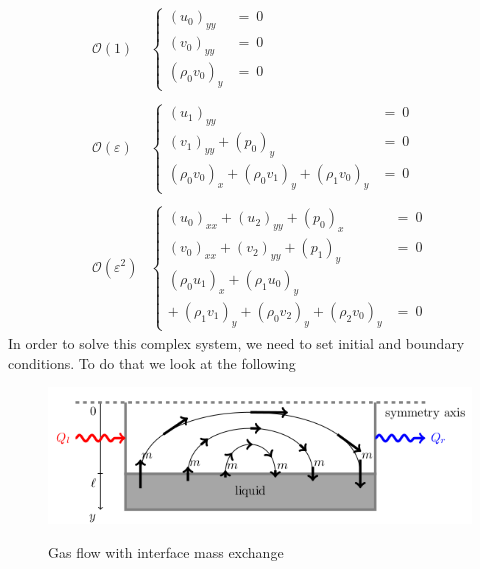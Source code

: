 \documentclass{article}
\begin{document}
\begin{align}
\label{eq:diff00}
\mathcal{O}(1)&\left\{\begin{array}{lr}
(u_{0})_{yy} &=\ 0\\
(v_{0})_{yy} &=\ 0\\
(\rho_{0}v_{0})_{y} &=\ 0
  \end{array}\right.\\\nonumber\\
\label{eq:diff01}
  \mathcal{O}(\varepsilon)&\left\{\begin{array}{lr}
  (u_{1})_{yy} &=\ 0\\
  (v_{1})_{yy}+(p_{0})_{y} &=\ 0\\
  (\rho_{0}v_{0})_{x} + (\rho_{0}v_{1})_{y} + (\rho_{1}v_{0})_{y} &=\ 0
    \end{array}\right.\\\nonumber\\
    \label{eq:diff02}
      \mathcal{O}(\varepsilon^{2})&\left\{\begin{array}{lr}
      (u_{0})_{xx}+(u_{2})_{yy}+(p_{0})_{x} &=\ 0\\
     (v_{0})_{xx}+(v_{2})_{yy}+(p_{1})_{y} &=\ 0\\
      (\rho_{0}u_{1})_{x} + (\rho_{1}u_{0})_{y} \\+\ (\rho_{1}v_{1})_{y} + (\rho_{0}v_{2})_{y} + (\rho_{2}v_{0})_{y} &=\ 0
        \end{array}\right.
\end{align}
In order to solve this complex system, we need to set initial and boundary conditions. To do that we look at the following
\begin{figure}[H]
\centering
\includegraphics[width=0.7\linewidth]{cosa}
\label{fig:cosa}
\caption{Gas flow with interface mass exchange}
\end{figure}
\end{document}
